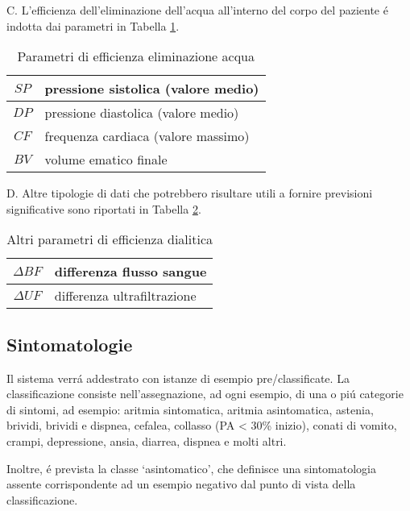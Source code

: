 \documentclass{acm_proc_article-sp}
\begin{document}
C. L'efficienza dell'eliminazione dell'acqua all'interno del corpo del paziente \'e indotta dai parametri in Tabella \ref{table:parametri-3}.

\begin{table}[h]
\centering
\begin{tabular}{|c|l|} \hline
$SP$ & pressione sistolica (valore medio)\\ \hline
$DP$ & pressione diastolica (valore medio)\\ \hline
$CF$ & frequenza cardiaca (valore massimo) \\ \hline
$BV$ & volume ematico finale\\
\hline\end{tabular}
\caption{Parametri di efficienza eliminazione acqua}
\label{table:parametri-3}
\end{table}

D. Altre tipologie di dati che potrebbero risultare utili a fornire previsioni significative sono riportati in Tabella \ref{table:parametri-4}.

\begin{table}[h]
\centering
\begin{tabular}{|c|l|} \hline
$\Delta BF$ & differenza flusso sangue\\ \hline
$\Delta UF$ & differenza ultrafiltrazione\\
\hline\end{tabular}
\caption{Altri parametri di efficienza dialitica}
\label{table:parametri-4}
\end{table}

\subsection{Sintomatologie}
Il sistema verr\'a addestrato con istanze di esempio pre\-/classificate. La classificazione consiste nell'assegnazione, ad ogni esempio, di una o pi\'u categorie di sintomi, ad esempio: aritmia sintomatica, aritmia asintomatica, astenia, brividi, brividi e dispnea, cefalea, collasso (PA < 30\% inizio), conati di vomito, crampi, depressione, ansia, diarrea, dispnea e molti altri.

Inoltre, \'e prevista la classe `asintomatico', che definisce una sintomatologia assente corrispondente ad un esempio negativo dal punto di vista della classificazione.

%
\balancecolumns

\end{document}
